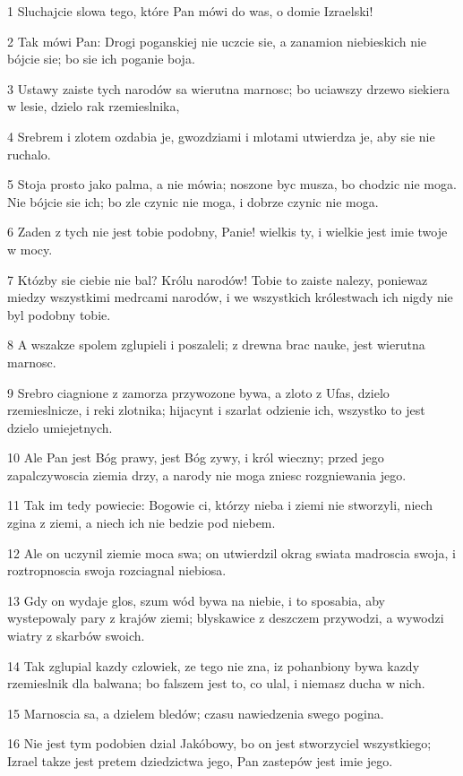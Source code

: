 \par 1 Sluchajcie slowa tego, które Pan mówi do was, o domie Izraelski!
\par 2 Tak mówi Pan: Drogi poganskiej nie uczcie sie, a zanamion niebieskich nie bójcie sie; bo sie ich poganie boja.
\par 3 Ustawy zaiste tych narodów sa wierutna marnosc; bo uciawszy drzewo siekiera w lesie, dzielo rak rzemieslnika,
\par 4 Srebrem i zlotem ozdabia je, gwozdziami i mlotami utwierdza je, aby sie nie ruchalo.
\par 5 Stoja prosto jako palma, a nie mówia; noszone byc musza, bo chodzic nie moga. Nie bójcie sie ich; bo zle czynic nie moga, i dobrze czynic nie moga.
\par 6 Zaden z tych nie jest tobie podobny, Panie! wielkis ty, i wielkie jest imie twoje w mocy.
\par 7 Któzby sie ciebie nie bal? Królu narodów! Tobie to zaiste nalezy, poniewaz miedzy wszystkimi medrcami narodów, i we wszystkich królestwach ich nigdy nie byl podobny tobie.
\par 8 A wszakze spolem zglupieli i poszaleli; z drewna brac nauke, jest wierutna marnosc.
\par 9 Srebro ciagnione z zamorza przywozone bywa, a zloto z Ufas, dzielo rzemieslnicze, i reki zlotnika; hijacynt i szarlat odzienie ich, wszystko to jest dzielo umiejetnych.
\par 10 Ale Pan jest Bóg prawy, jest Bóg zywy, i król wieczny; przed jego zapalczywoscia ziemia drzy, a narody nie moga zniesc rozgniewania jego.
\par 11 Tak im tedy powiecie: Bogowie ci, którzy nieba i ziemi nie stworzyli, niech zgina z ziemi, a niech ich nie bedzie pod niebem.
\par 12 Ale on uczynil ziemie moca swa; on utwierdzil okrag swiata madroscia swoja, i roztropnoscia swoja rozciagnal niebiosa.
\par 13 Gdy on wydaje glos, szum wód bywa na niebie, i to sposabia, aby wystepowaly pary z krajów ziemi; blyskawice z deszczem przywodzi, a wywodzi wiatry z skarbów swoich.
\par 14 Tak zglupial kazdy czlowiek, ze tego nie zna, iz pohanbiony bywa kazdy rzemieslnik dla balwana; bo falszem jest to, co ulal, i niemasz ducha w nich.
\par 15 Marnoscia sa, a dzielem bledów; czasu nawiedzenia swego pogina.
\par 16 Nie jest tym podobien dzial Jakóbowy, bo on jest stworzyciel wszystkiego; Izrael takze jest pretem dziedzictwa jego, Pan zastepów jest imie jego.
